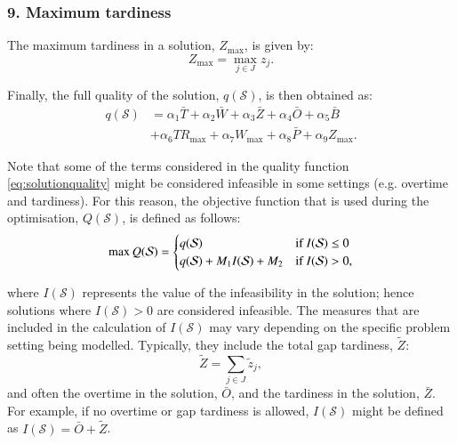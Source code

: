 \documentclass[a4paper,11pt,authoryear]{elsarticle}
\begin{document}
\subsubsection*{9. Maximum tardiness}
\noindent The maximum tardiness in a solution, $Z_{\text{max}}$, is given by:
\begin{equation}
	Z_{\text{max}} = \max_{j \in J} z_j. \label{eq:maxtardiness}
\end{equation}


Finally, the full quality of the solution, $q(\mathcal{S})$, is then obtained as:
\begin{align}
	q(\mathcal{S}) &= \alpha_1 \bar{T} %
	+ \alpha_2 \bar{W} %
	+ \alpha_3 \bar{Z} %
	+ \alpha_4 \bar{O} %
	+ \alpha_5 \bar{B} \nonumber \\%
	&+ \alpha_6 TR_{\text{max}} %
	+ \alpha_7 W_{\text{max}} %
	+ \alpha_8 \bar{P} %
	+ \alpha_9 Z_{\text{max}}. \label{eq:solutionquality}
\end{align}

\noindent Note that some of the terms considered in the quality function \eqref{eq:solutionquality} might be considered infeasible in some settings (e.g. overtime and tardiness). For this reason, the objective function that is used during the optimisation, $Q(\mathcal{S})$, is defined as follows:
\begin{equation}
  \max Q(\mathcal{S}) =
  \begin{cases}
   q(\ensuremath{\mathcal{S}}) & \text{if \ensuremath{I(\mathcal{S}) \leq 0}} \\
   q(\ensuremath{\mathcal{S}}) + \ensuremath{M_1 I(\mathcal{S})} + \ensuremath{M_2} & \text{if \ensuremath{I(\mathcal{S}) > 0}}, \label{eq:realobjfunction}
  \end{cases}
\end{equation}

\noindent where $I(\mathcal{S})$ represents the value of the infeasibility in the solution; hence solutions where $I(\mathcal{S}) > 0$ are considered infeasible. The measures that are included in the calculation of $I(\mathcal{S})$ may vary depending on the specific problem setting being modelled. Typically, they include the total gap tardiness, $\tilde{Z}$:
\begin{equation}
    \tilde{Z} = \sum_{j \in J} \tilde{z}_j, \label{eq:totalgaptardiness}
\end{equation}
 and often the overtime in the solution, $\bar{O}$, and the tardiness in the solution, $\bar{Z}$. For example, if no overtime or gap tardiness is allowed, $I(\mathcal{S})$ might be defined as $I(\mathcal{S}) = \bar{O} + \tilde{Z}$.
\end{document}
